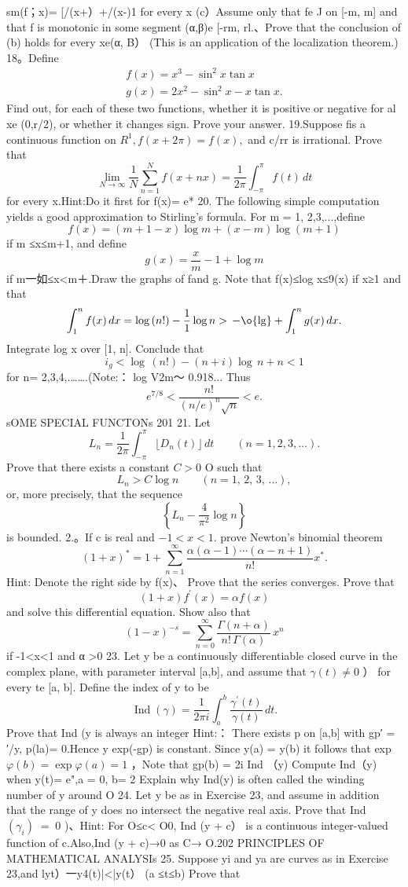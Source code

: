 sm(f；x)= [/(x+）+/(x-)1 for every x (c）Assume only that fe J on [-m, m] and that f is monotonic in some segment (α,β)e [-rm, rl.、Prove that the conclusion of (b) holds for every xe(α, B） (This is an application of the localization theorem.) 18。Define $$ \begin{array}{l}{{f(x)=x^{3}-\sin^{2}x\tan x}}\\ {{g(x)=2x^{2}-\sin^{2}x-x\tan x.}}\end{array} $$ Find out, for each of these two functions, whether it is positive or negative for al xe (0,r/2), or whether it changes sign. Prove your answer. 19.Suppose fis a continuous function on $R^{1},f(x+2\pi)=f(x),$ and c/rr is irrational. Prove that $$ \operatorname*{lim}_{N\to\infty}{\frac{1}{N}}\sum_{n=1}^{N}f(x+n x)={\frac{1}{2\pi}}\int_{-\pi}^{\pi}f(t)\,d t $$ for every x.Hint:Do it first for f(x)= e* 20. The following simple computation yields a good approximation to Stirling's formula. For m = 1, 2,3,...,define $$ f(x)=(m+1-x)\log m+(x-m)\log\left(m+1\right) $$ if m ≤x≤m+1, and define $$ g(x)={\frac{x}{m}}-1+\log m $$ if m一如≤x<m＋.Draw the graphs of fand g. Note that f(x)≤log x≤9(x) if x≥1 and that $$ \int_{1}^{n}f(x)\,d x=\log{(n!)}-\frac{1}{1}\log n>\,-\o{\lg}+\int_{1}^{n}g(x)\,d x. $$ Integrate log x over [1, n]. Conclude that $$ i_{g}<\log\,(n!)-(n+i)\log\,n+n<1 $$ for n= 2,3,4,.…….(Note:： log V2m～ 0.918... Thus $$ e^{7/8}<{\frac{n!}{(n/e)^{n}{\sqrt{n}}}}<e. $$sOME SPECIAL FUNCTONs 201 21. Let $$ L_{n}=\frac{1}{2\pi}\int_{-\pi}^{\pi} \lfloor D_{n}(t) \rfloor\,d t\qquad(n=1,2,3,\dots). $$ Prove that there exists a constant $C>0$ O such that $$ L_{n}>C\log n\qquad(n=1,\,2,\,3,\,\dots), $$ or, more precisely, that the sequence $$ \left\{L_{n}-{\frac{4}{\pi^{2}}}\log n\right\} $$ is bounded. 2.。If c is real and $-1<x<1.$ prove Newton's binomial theorem $$ (1+x)^{*}=1+\sum_{n=1}^{\infty}{\frac{\alpha(\alpha-1)\cdots(\alpha-n+1)}{n!}}x^{*}. $$ Hint: Denote the right side by f(x)、 Prove that the series converges. Prove that $$ (1+x)f^{\prime}(x)=\alpha f(x) $$ and solve this differential equation. Show also that $$ (1-x)^{-s}=\sum_{n=0}^{\infty}{\frac{\Gamma(n+\alpha)}{n!\,\Gamma(\alpha)}}\,x^{n} $$ if -1<x<1 and α >0 23. Let y be a continuously differentiable closed curve in the complex plane, with parameter interval [a,b], and assume that $\gamma(t)\neq0$ ） for every te [a, b]. Define the index of y to be $$ \operatorname{Ind}\left(\gamma\right)={\frac{1}{2\pi i}}\int_{a}^{b}{\frac{\gamma^{\prime}(t)}{\gamma(t)}}\,d t. $$ Prove that Ind (y is always an integer Hint:： There exists p on [a,b] with gp′ = ′/y, p(la)= 0.Hence y exp(-gp) is constant. Since y(a) = y(b) it follows that exp $\varphi(b)=\exp\varphi(a)=1$ ，Note that gp(b) = 2i Ind （y) Compute Ind（y) when y(t)= e",a = 0, b= 2 Explain why Ind(y) is often called the winding number of y around O 24. Let y be as in Exercise 23, and assume in addition that the range of y does no intersect the negative real axis. Prove that Ind $\scriptstyle(\gamma_{i})\;=\;0$ )、Hint: For O≤c< O0, Ind (y + c） is a continuous integer-valued function of c.Also,Ind (y + c)→0 as C→ O.202 PRINCIPLES OF MATHEMATICAL ANALYSIs 25. Suppose yi and ya are curves as in Exercise 23,and lyt）一y4(t)|<|y(t） (a ≤t≤b) Prove that 